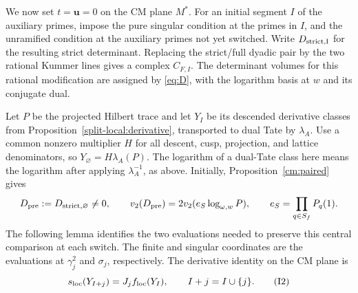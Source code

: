 We now set \(t=\mathbf u=0\) on the CM plane \(M^*\). For an initial
segment \(I\) of the auxiliary primes, impose the pure singular condition
at the primes in \(I\), and the unramified condition at the auxiliary
primes not yet switched. Write \(D_{\rm strict,I}\) for the resulting
strict determinant. Replacing the strict/full dyadic pair by the two
rational Kummer lines gives a complex \(C_{F,I}\). The determinant volumes
for this rational modification are assigned by \eqref{eq:D}, with the
logarithm basis at \(w\) and its conjugate dual.

Let \(P\) be the projected Hilbert trace and let \(Y_I\) be its descended
derivative classes from Proposition~\ref{split-local:derivative}, transported
to dual Tate by \(\lambda_A\). Use a common nonzero multiplier \(H\) for
all descent, cusp, projection, and lattice denominators, so
\(Y_\varnothing=H\lambda_A(P)\). The logarithm of a dual-Tate class here
means the logarithm after applying \(\lambda_A^{-1}\), as above. Initially,
Proposition~\ref{cm:paired} gives
\[
 D_{\rm pre}:=D_{\rm strict,\varnothing}\ne0,
 \qquad v_2(D_{\rm pre})=2v_2(e_S\log_{\omega,w}P),
 \qquad e_S=\prod_{q\in S_f}P_q(1).
\]
The following lemma identifies the two evaluations needed to preserve this
central comparison at each switch.
The finite and singular coordinates are the evaluations at
\(\gamma_j^2\) and \(\sigma_j\), respectively. The derivative identity
on the CM plane is
\[
 s_{\rm loc}(Y_{I+j})=J_jf_{\rm loc}(Y_I),\qquad
 I+j=I\cup\{j\}.
 \tag{I2}\label{eq:I2}
\]

